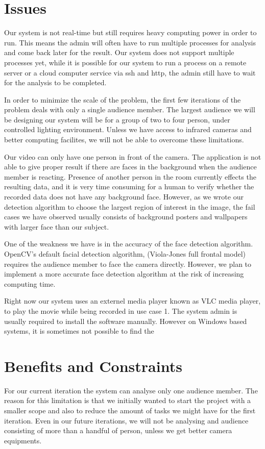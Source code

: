 \documentclass[12pt,a4paper,man]{report}
\begin{document}
\chapter{Issues}
\label{sec:org27f035e}
Our system is not real-time but still requires heavy computing power in order to run. This means the admin will often have to run multiple processes for analysis and come back later for the result. Our system does not support multiple processes yet, while it is possible for our system to run a process on a remote server or a cloud computer service via ssh and http, the admin still have to wait for the analysis to be completed. 

In order to minimize the scale of the problem, the first few iterations of the problem deals with only a single audience member. The largest audience we will be designing our system will be for a group of two to four person, under controlled lighting environment. Unless we have access to infrared cameras and better computing facilites, we will not be able to overcome these limitations. 

Our video can only have one person in front of the camera. The application is not able to give proper result if there are faces in the background when the audience member is reacting. Presence of another person in the room currently effects the resulting data, and it is very time consuming for a human to verify whether the recorded data does not have any background face. However, as we wrote our detection algorithm to choose the largest region of interest in the image, the fail cases we have observed usually consists of background posters and wallpapers with larger face than our subject.

One of the weakness we have is in the accuracy of the face detection algorithm. OpenCV's default facial detection algorithm, (Viola-Jones full frontal model) requires the audience member to face the camera directly. However, we plan to implement a more accurate face detection algorithm at the risk of increasing computing time.

Right now our system uses an externel media player known as VLC media player, to play the movie while being recorded in use case 1. The system admin is usually required to install the software manually. However on Windows based systems, it is sometimes not possible to find the 

\chapter{Benefits and Constraints}
\label{sec:orgb855ad8}
For our current iteration the system can analyse only one audience member. The reason for this limitation is that we initially wanted to start the project with a smaller scope and also to reduce the amount of tasks we might have for the first iteration. Even in our future iterations, we will not be analysing and audience consisting of more than a handful of person, unless we get better camera equipments.
\end{document}
